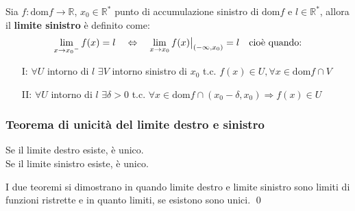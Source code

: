 \documentclass[a4paper]{article}
\newcommand\restr[2]{{%
	\left.\kern-\nulldelimiterspace %
	#1 %
	\vphantom{\big|} %
	\right|_{#2} %
	}}
\newcommand\dom{\text{dom}}
\begin{document}
Sia \(f: \dom f \to \mathbb{R}\), \(x_0 \in \mathbb{R}^*\) punto di accumulazione sinistro di \(\dom f\) e \(l \in \mathbb{R}^*\), allora il \textbf{limite sinistro} è definito come:
\[\lim_{x \to {x_0}^-} f(x) = l \quad \Leftrightarrow \quad \lim_{x \to {x_0}} \restr{f(x)}{\left( - \infty, x_0 \right)} = l \quad \text{cioè quando:}\]
\begin{itemize}
	\item[I:] \(\forall U\) intorno di \(l\) \(\exists V\) intorno sinistro di \(x_0\) t.c. \(f(x) \in U, \forall x \in \dom f \cap V\)
	\item[II:] \(\forall U\) intorno di \(l\) \(\exists \delta > 0\) t.c. \(\forall x \in \dom f \cap \left( x_0 - \delta, x_0 \right) \Rightarrow f(x) \in U\)
\end{itemize}

\subsubsection*{Teorema di unicità del limite destro e sinistro}
Se il limite destro esiste, è unico. \\
Se il limite sinistro esiste, è unico. 

I due teoremi si dimostrano in quando limite destro e limite sinistro sono limiti di funzioni ristrette e in quanto limiti, se esistono sono unici. \qed
\end{document}
